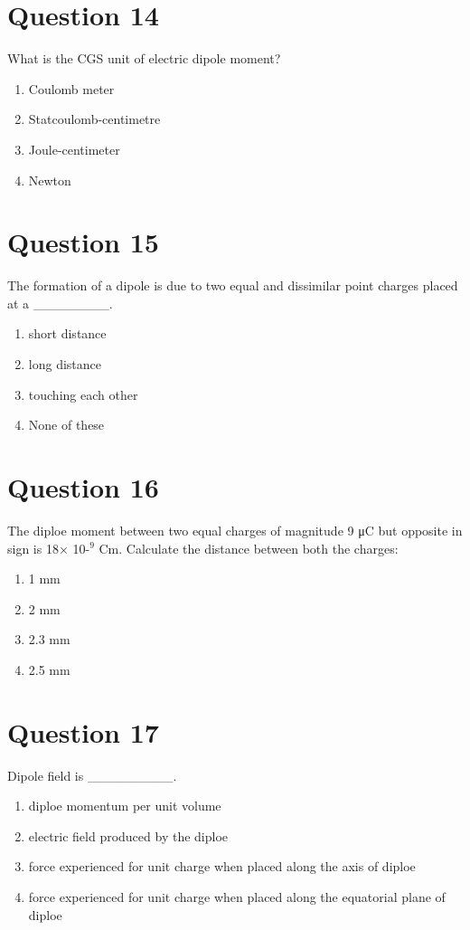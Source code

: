 \documentclass{article}
\begin{document}
\section*{Question 14}
What is the CGS unit of electric dipole moment?
\begin{enumerate}[label=(\alph*)]
\item Coulomb meter
\item Statcoulomb-centimetre
\item Joule-centimeter
\item Newton
\end{enumerate}
\newpage
\section*{Question 15}
The formation of a dipole is due to two equal and dissimilar point charges placed at a ________.
\begin{enumerate}[label=(\alph*)]
\item short distance
\item long distance
\item touching each other
\item None of these
\end{enumerate}
\newpage
\section*{Question 16}
The diploe moment between two equal charges of magnitude 9 μC but opposite in sign is 18× 10-$^{9}$ Cm. Calculate the distance between both the charges:
\begin{enumerate}[label=(\alph*)]
\item 1 mm
\item 2 mm
\item 2.3 mm
\item 2.5 mm
\end{enumerate}
\newpage
\section*{Question 17}
Dipole field is _________.
\begin{enumerate}[label=(\alph*)]
\item diploe momentum per unit volume 
\item electric field produced by the diploe
\item force experienced for unit charge when placed along the axis of diploe 
\item force experienced for unit charge when placed along the equatorial plane of diploe 
\end{enumerate}
\newpage
\end{document}
